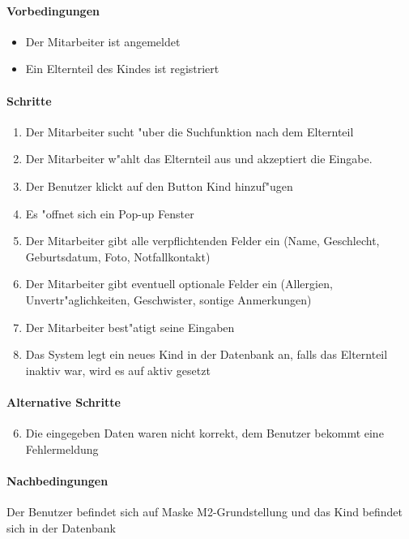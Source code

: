   \paragraph{Vorbedingungen}
  \begin{itemize}
   \item Der Mitarbeiter ist angemeldet
   \item Ein Elternteil des Kindes ist registriert
  \end{itemize}

  \paragraph{Schritte}
  \begin{enumerate}
   \item Der Mitarbeiter sucht "uber die Suchfunktion nach dem Elternteil
   \item Der Mitarbeiter w"ahlt das Elternteil aus und akzeptiert die Eingabe.
   \item Der Benutzer klickt auf den Button \dq Kind hinzuf"ugen\dq
   \item Es "offnet sich ein Pop-up Fenster
   \item Der Mitarbeiter gibt alle verpflichtenden Felder ein (Name, Geschlecht, Geburtsdatum, Foto, Notfallkontakt)
   \item Der Mitarbeiter gibt eventuell optionale Felder ein (Allergien, Unvertr"aglichkeiten, Geschwister, sontige Anmerkungen)
   \item Der Mitarbeiter best"atigt seine Eingaben
   \item Das System legt ein neues Kind in der Datenbank an, falls das Elternteil inaktiv war, wird es auf aktiv gesetzt
  \end{enumerate}

  \paragraph{Alternative Schritte}
  \begin{enumerate}
  \setcounter{enumi}{5}
   \item Die eingegeben Daten waren nicht korrekt, dem Benutzer bekommt eine Fehlermeldung
  \end{enumerate}

  \paragraph{Nachbedingungen}
  Der Benutzer befindet sich auf Maske M2-Grundstellung und das Kind befindet sich in der Datenbank

